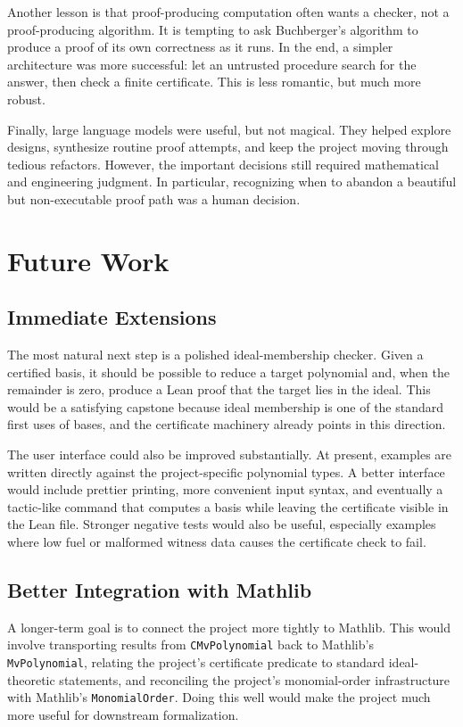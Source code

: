 \documentclass[acmsmall,nonacm,screen]{acmart}
\begin{document}
Another lesson is that proof-producing computation often wants a checker, not a proof-producing
algorithm.
It is tempting to ask Buchberger's algorithm to produce a proof of its own correctness as it runs.
In the end, a simpler architecture was more successful: let an untrusted procedure search for the
answer, then check a finite certificate.
This is less romantic, but much more robust.

Finally, large language models were useful, but not magical.
They helped explore designs, synthesize routine proof attempts, and keep the project moving through
tedious refactors.
However, the important decisions still required mathematical and engineering judgment.
In particular, recognizing when to abandon a beautiful but non-executable proof path was a human
decision.

\section{Future Work}

\subsection{Immediate Extensions}

The most natural next step is a polished ideal-membership checker.
Given a certified \Groebner{} basis, it should be possible to reduce a target polynomial and, when
the remainder is zero, produce a Lean proof that the target lies in the ideal.
This would be a satisfying capstone because ideal membership is one of the standard first uses of
\Groebner{} bases, and the certificate machinery already points in this direction.

The user interface could also be improved substantially.
At present, examples are written directly against the project-specific polynomial types.
A better interface would include prettier printing, more convenient input syntax, and eventually a
tactic-like command that computes a basis while leaving the certificate visible in the Lean file.
Stronger negative tests would also be useful, especially examples where low fuel or malformed
witness data causes the certificate check to fail.

\subsection{Better Integration with Mathlib}

A longer-term goal is to connect the project more tightly to Mathlib.
This would involve transporting results from \texttt{CMvPolynomial} back to Mathlib's
\texttt{MvPolynomial}, relating the project's certificate predicate to standard ideal-theoretic
statements, and reconciling the project's monomial-order infrastructure with Mathlib's
\texttt{MonomialOrder}.
Doing this well would make the project much more useful for downstream formalization.
\end{document}
